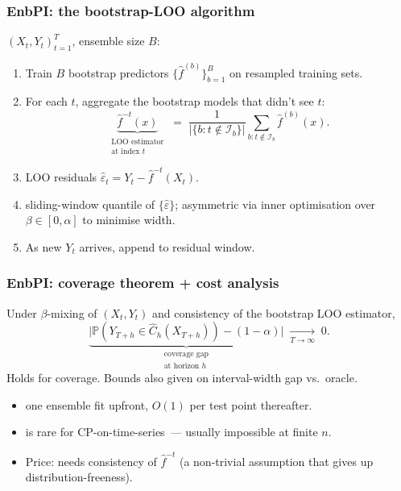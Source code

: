 \documentclass[11pt, aspectratio=169, xcolor={dvipsnames}, usepdftitle=false]{beamer}
\begin{document}
\begin{frame}
\frametitle{EnbPI: the bootstrap-LOO algorithm}
 $(X_t, Y_t)_{t=1}^T$, ensemble size $B$:
\begin{enumerate}
\item Train $B$ bootstrap predictors $\{\hat{f}^{(b)}\}_{b=1}^B$ on resampled training sets.
\item For each $t$, aggregate  the bootstrap models that didn't see $t$:
\begin{equation*}
\underbrace{\hat{f}^{-t}(x)}_{\substack{\text{LOO estimator}\\\text{at index } t}}
\;=\;
\frac{1}{|\{b : t \notin \mathcal{I}_b\}|}
\sum_{b : t \notin \mathcal{I}_b}
\hat{f}^{(b)}(x).
\end{equation*}
\item LOO residuals $\hat{\varepsilon}_t = Y_t - \hat{f}^{-t}(X_t)$.
\item {} sliding-window quantile of $\{\hat{\varepsilon}\}$; asymmetric via inner optimisation over $\beta \in [0, \alpha]$ to minimise width.
\item As new $Y_t$ arrives, append to residual window. 
\end{enumerate}
\end{frame}

\begin{frame}
\frametitle{EnbPI: coverage theorem + cost analysis}
\begin{theorem}
Under $\beta$-mixing of $(X_t, Y_t)$ and consistency of the bootstrap LOO estimator,
\begin{equation*}
\underbrace{\bigl|\mathbb{P}(Y_{T+h} \in \hat{C}_h(X_{T+h})) - (1 - \alpha)\bigr|}_{\substack{\text{coverage gap}\\\text{at horizon } h}}
\;\xrightarrow[T\to\infty]{}\;
0.
\end{equation*}
Holds for  coverage. Bounds also given on interval-width gap vs.\ oracle.
\end{theorem}
\begin{itemize}
\item {} one ensemble fit upfront, $O(1)$ per test point thereafter.
\item {} is rare for CP-on-time-series~--- usually impossible at finite $n$.
\item Price: needs consistency of $\hat{f}^{-t}$ (a non-trivial assumption that gives up distribution-freeness).
\end{itemize}
\end{frame}
\end{document}
